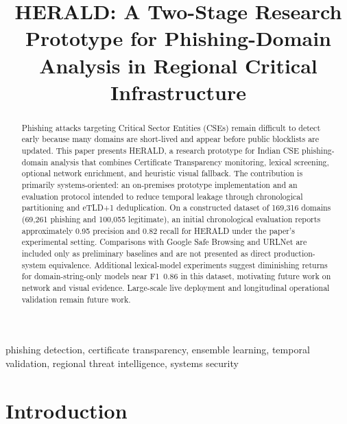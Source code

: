 \documentclass[conference]{IEEEtran}
\begin{document}
\title{HERALD: A Two-Stage Research Prototype for Phishing-Domain Analysis in Regional Critical Infrastructure}

\author{
}

\maketitle

\begin{abstract}
Phishing attacks targeting Critical Sector Entities (CSEs) remain difficult to detect early because many domains are short-lived and appear before public blocklists are updated. This paper presents HERALD, a research prototype for Indian CSE phishing-domain analysis that combines Certificate Transparency monitoring, lexical screening, optional network enrichment, and heuristic visual fallback. The contribution is primarily systems-oriented: an on-premises prototype implementation and an evaluation protocol intended to reduce temporal leakage through chronological partitioning and eTLD+1 deduplication. On a constructed dataset of 169,316 domains (69,261 phishing and 100,055 legitimate), an initial chronological evaluation reports approximately 0.95 precision and 0.82 recall for HERALD under the paper's experimental setting. Comparisons with Google Safe Browsing and URLNet are included only as preliminary baselines and are not presented as direct production-system equivalence. Additional lexical-model experiments suggest diminishing returns for domain-string-only models near F1~0.86 in this dataset, motivating future work on network and visual evidence. Large-scale live deployment and longitudinal operational validation remain future work.
\end{abstract}

\begin{IEEEkeywords}
phishing detection, certificate transparency, ensemble learning, temporal validation, regional threat intelligence, systems security
\end{IEEEkeywords}

\section{Introduction}
\end{document}

